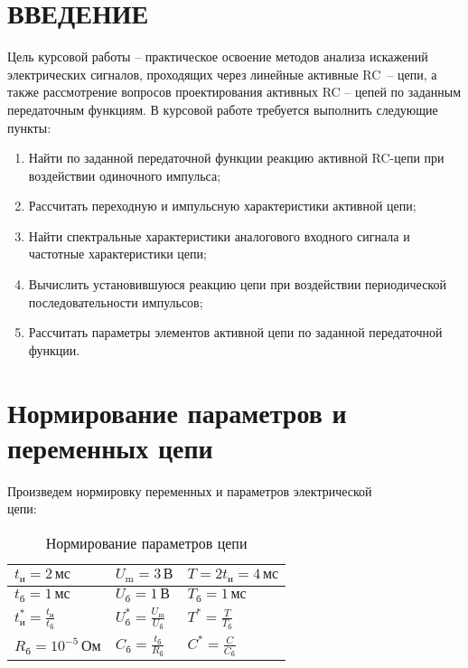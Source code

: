 \documentclass[a4paper,14pt ]{article} %
\begin{document}
\section{ВВЕДЕНИЕ}
Цель курсовой работы – практическое освоение методов анализа искажений электрических сигналов, проходящих через линейные активные   RC~– цепи, а также рассмотрение вопросов проектирования активных RC – цепей по заданным передаточным функциям. 
В курсовой работе требуется выполнить следующие пункты: 
    \begin{enumerate}
        \item Найти по заданной передаточной функции реакцию активной RC-цепи при воздействии одиночного импульса; 
        \item Рассчитать переходную и импульсную характеристики активной цепи;  
        \item Найти спектральные характеристики аналогового входного сигнала и частотные характеристики цепи;  
        \item Вычислить 	установившуюся 	реакцию 	цепи 	при 	воздействии 
        периодической последовательности импульсов;  
        \item Рассчитать параметры элементов активной цепи по заданной передаточной функции.
    \end{enumerate}
    \newpage
    \section{Нормирование параметров и переменных цепи}
    Произведем нормировку переменных и параметров электрической \\ цепи:
    \begin{table*}[h!]
        \centering
        \begin{tabularx}{\linewidth} { |>{\raggedright\arraybackslash}X | X | X |}
            \hline
           $ t_\text{и} = 2 \, \text{мс} $ & $ U_\text{m} = 3 \, \text{В} $ & $T = 2t_\text{и} = 4 \, \text{мс}$ \\ \hline
           $ t_\text{б} = 1 \, \text{мс} $ & $ U_\text{б} = 1 \, \text{В} $ & $T_\text{б} = 1 \, \text{мс} $ \\ \hline 
           $ t^*_\text{и} = \frac{t_\text{и}}{t_\text{б}} $ &  
            $ U^*_\text{б} = \frac{U_\text{m}}{U_\text{б}} $ &
            $ T^* = \frac{T }{T_\text{б}} $ \\ \hline
            $ R_\text{б} = 10^{-5} \,\text{Ом}$ & $C_\text{б} = \frac{ t_\text{б}}{R_\text{б}} $ & $C^* = \frac{C}{C_\text{б}} $ \\
            \hline
        \end{tabularx}
        \caption{Нормирование параметров цепи}
        \label{table:1}
    \end{table*}
\end{document}
